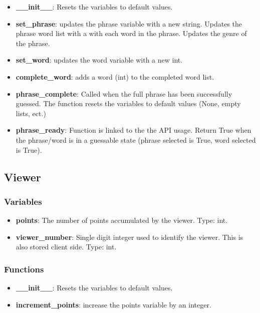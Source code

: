 \documentclass{article}
\begin{document}
\begin{itemize}

	\item \textbf{\_\_init\_\_}: Resets the variables to default values.

	\item \textbf{set\_phrase}: updates the phrase variable with a new string. Updates the phrase word list with a with each word in the phrase. Updates the genre of the phrase.
	
	\item \textbf{set\_word}: updates the word variable with a  new int.
	
	\item \textbf{complete\_word}: adds a word (int) to the completed word list.
	
	\item \textbf{phrase\_complete}: Called when the full phrase has been successfully guessed. The function resets the variables to default values (None, empty lists, ect.)
	
	\item \textbf{phrase\_ready}: Function is linked to the the API usage. Return True when the phrase/word is in a guessable state (phrase selected is True, word selected is True).

\end{itemize}


\subsection{Viewer}
\subsubsection{Variables}

\begin{itemize}
	\item \textbf{points}: The number of points accumulated by the viewer. Type: int.

	\item \textbf{viewer\_number}: Single digit integer used to identify the viewer. This is also stored client side. Type: int.

\end{itemize}

\subsubsection{Functions}

\begin{itemize}

	\item \textbf{\_\_init\_\_}: Resets the variables to default values.

	\item \textbf{increment\_points}: increase the points variable by an integer.
	
\end{itemize}
\end{document}
